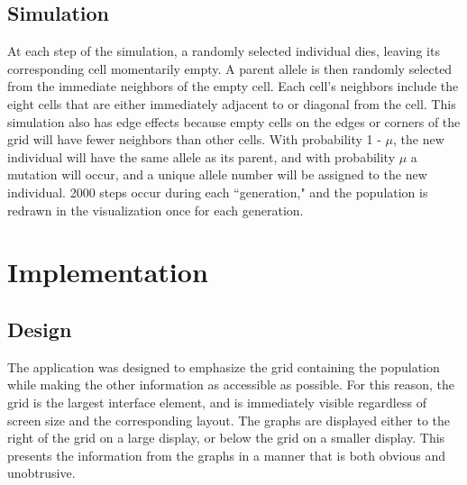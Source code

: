 \documentclass[12pt]{article}
\begin{document}
\begin{spacing}{1.6}
\subsection{Simulation}
At each step of the simulation, a randomly selected individual dies, leaving its corresponding cell momentarily empty. A parent allele is then randomly selected from the immediate neighbors of the empty cell. Each cell's neighbors include the eight cells that are either immediately adjacent to or diagonal from the cell. This simulation also has edge effects because empty cells on the edges or corners of the grid will have fewer neighbors than other cells. With probability 1 - $\mu$, the new individual will have the same allele as its parent, and with probability $\mu$ a mutation will occur, and a unique allele number will be assigned to the new individual. 2000 steps occur during each ``generation," and the population is redrawn in the visualization once for each generation.

\section{Implementation}

\subsection{Design}
The application was designed to emphasize the grid containing the population while making the other information as accessible as possible. For this reason, the grid is the largest interface element, and is immediately visible regardless of screen size and the corresponding layout. The graphs are displayed either to the right of the grid on a large display, or below the grid on a smaller display. This presents the information from the graphs in a manner that is both obvious and unobtrusive.


\end{spacing}
\end{document}
